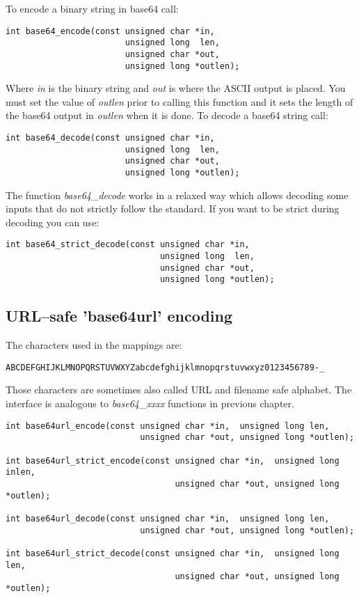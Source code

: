 \documentclass[synpaper]{book}
\begin{document}
To encode a binary string in base64 call:
\begin{verbatim}
int base64_encode(const unsigned char *in,
                        unsigned long  len,
                        unsigned char *out,
                        unsigned long *outlen);
\end{verbatim}
Where \textit{in} is the binary string and \textit{out} is where the ASCII output is placed.  You must set the value of \textit{outlen} prior
to calling this function and it sets the length of the base64 output in \textit{outlen} when it is done.  To decode a base64
string call:
\begin{verbatim}
int base64_decode(const unsigned char *in,
                        unsigned long  len,
                        unsigned char *out,
                        unsigned long *outlen);
\end{verbatim}

The function \textit{base64\_decode} works in a relaxed way which allows decoding some inputs that do not strictly follow the standard.
If you want to be strict during decoding you can use:
\begin{verbatim}
int base64_strict_decode(const unsigned char *in,
                               unsigned long  len,
                               unsigned char *out,
                               unsigned long *outlen);
\end{verbatim}

\subsection{URL--safe 'base64url' encoding}
The characters used in the mappings are:
\begin{verbatim}
ABCDEFGHIJKLMNOPQRSTUVWXYZabcdefghijklmnopqrstuvwxyz0123456789-_
\end{verbatim}
Those characters are sometimes also called URL and filename safe alphabet.
The interface is analogous to \textit{base64\_xxxx} functions in previous chapter.

\begin{verbatim}
int base64url_encode(const unsigned char *in,  unsigned long len,
                           unsigned char *out, unsigned long *outlen);

int base64url_strict_encode(const unsigned char *in,  unsigned long inlen,
                                  unsigned char *out, unsigned long *outlen);

int base64url_decode(const unsigned char *in,  unsigned long len,
                           unsigned char *out, unsigned long *outlen);

int base64url_strict_decode(const unsigned char *in,  unsigned long len,
                                  unsigned char *out, unsigned long *outlen);
\end{verbatim}
\end{document}
